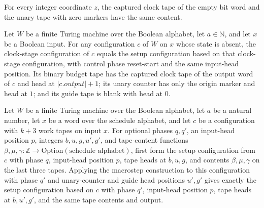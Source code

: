 \begin{lemma}
\label{Complexity.clockTape_unary_zero}
\leanok
{}
For every integer coordinate $z$, the captured clock tape of the empty bit word and the
unary tape with zero markers have the same content.
\end{lemma}

\begin{lemma}
\label{Complexity.clockStageCfg_setup}
\leanok
{}
Let $W$ be a finite Turing machine over the Boolean alphabet, let $a\in\mathbb{N}$, and
let $x$ be a Boolean input. For any configuration $c$ of $W$ on $x$ whose state is
absent, the clock-stage configuration of $c$ equals the setup configuration based on
that clock-stage configuration, with control phase reset-start and the same input-head
position. Its binary budget tape has the captured clock tape of the output word of $c$
and head at $|c.output|+1$; its unary counter has only the origin marker and head at
$1$; and its guide tape is blank with head at $0$.
\end{lemma}

\begin{lemma}
\label{Complexity.macroCfg_setup}
\leanok
{}
Let $W$ be a finite Turing machine over the Boolean alphabet, let $a$ be a natural
number, let $x$ be a word over the schedule alphabet, and let $c$ be a configuration
with $k+3$ work tapes on input $x$. For optional phases $q,q'$, an input-head position
$p$, integers $b,u,g,u',g'$, and tape-content functions $\beta,\mu,\gamma : \mathbb{Z}
\to \text{Option}(\text{schedule alphabet})$, first form the setup configuration from
$c$ with phase $q$, input-head position $p$, tape heads at $b,u,g$, and contents
$\beta,\mu,\gamma$ on the last three tapes. Applying the macrostep construction to this
configuration with phase $q'$ and unary-counter and guide head positions $u',g'$ gives
exactly the setup configuration based on $c$ with phase $q'$, input-head position $p$,
tape heads at $b,u',g'$, and the same tape contents and output.
\end{lemma}

